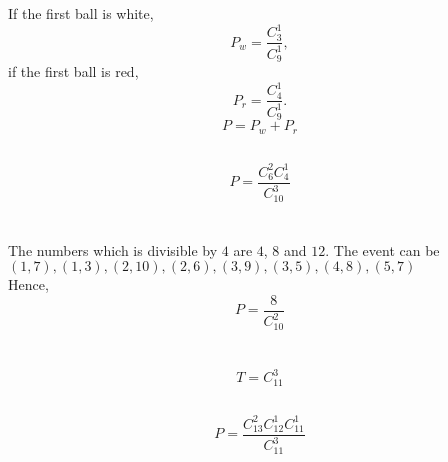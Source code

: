 \documentclass{article}
\begin{document}
        \subsection{}
                If the first ball is white,
                        $$P_w=\frac{C_3^1}{C_9^1},$$
                if the first ball is red,
                        $$P_r=\frac{C_4^1}{C_9^1}.$$
                $$P=P_w+P_r$$

        \subsection{}
                $$P=\frac{C_6^2C_4^1}{C_{10}^3}$$

    \section{}
                The numbers which is divisible by $4$ are $4$, $8$ and $12$.
                The event can be $(1,7),(1,3),(2,10),(2,6),(3,9),(3,5),(4,8),(5,7)$
                \\
                Hence,
                $$P=\frac{8}{C_{10}^2}$$

    \section{}
        \subsection{}               
                $$T=C_{11}^{3}$$
        \subsection{}
                $$P=\frac{C_{13}^2C_{12}^1C_{11}^1}{C_{11}^3}$$
\end{document}

